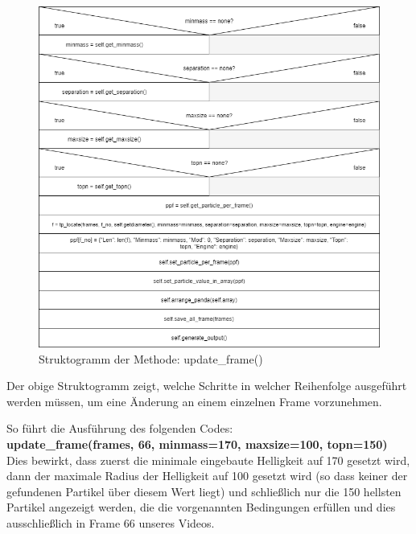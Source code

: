 \begin{figure}[H]
  \centering
  \includegraphics[width=1\textwidth]{Grafiken/pts/update_frame.png}
  \caption{Struktogramm der Methode: update\_frame()}
  \label{fig:kap3_strukto_update_frame}
\end{figure}

Der obige Struktogramm zeigt, welche Schritte in welcher Reihenfolge ausgeführt werden müssen, um eine Änderung an einem einzelnen Frame vorzunehmen.

So führt die Ausführung des folgenden Codes:\\
\textbf{update\_frame(frames, 66, minmass=170, maxsize=100, topn=150)}\\
Dies bewirkt, dass zuerst die minimale eingebaute Helligkeit auf 170 gesetzt wird, dann der maximale Radius der Helligkeit auf 100 gesetzt wird (so dass keiner der gefundenen Partikel über diesem Wert liegt) und schließlich nur die 150 hellsten Partikel angezeigt werden, die die vorgenannten Bedingungen erfüllen und dies ausschließlich in Frame 66 unseres Videos.







